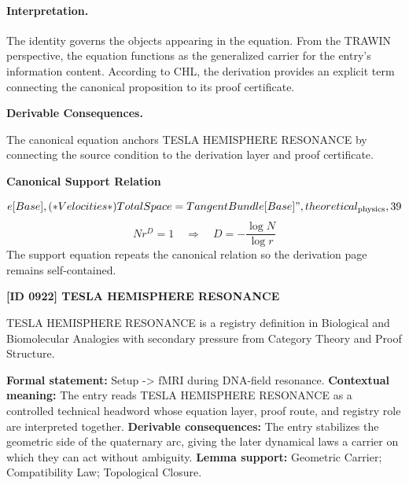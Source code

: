 \paragraph{Interpretation.}
The identity governs the objects appearing in the equation. From the TRAWIN perspective, the equation functions as the generalized carrier for the entry’s information content. According to CHL, the derivation provides an explicit term connecting the canonical proposition to its proof certificate.

\par\vspace{0.35em}
\noindent\textbf{Derivable Consequences.}\quad
\begingroup
\footnotesize
\raggedright
The canonical equation anchors TESLA HEMISPHERE RESONANCE by connecting the source condition to the derivation layer and proof certificate.
\par\endgroup

\noindent\textbf{Canonical Support Relation}\par
\[
e[Base], (* Velocities *) TotalSpace = TangentBundle[Base]",theoretical_{\mathrm{physics}},39
\]
\[
N r^{D} = 1 \quad\Longrightarrow\quad D = -\frac{\log N}{\log r}
\]
\noindent The support equation repeats the canonical relation so the derivation page remains self-contained.\par

\clearpage
\noindent\textbf{[ID 0922] TESLA HEMISPHERE RESONANCE}\par
\vspace{0.35em}
\begingroup\small
{}
TESLA HEMISPHERE RESONANCE is a registry definition in Biological and Biomolecular Analogies with secondary pressure from Category Theory and Proof Structure.

\begingroup\footnotesize\setlength{\emergencystretch}{3em}\sloppy
\textbf{Formal statement:} Setup -> fMRI during DNA-field resonance. \textbf{Contextual meaning:} The entry reads TESLA HEMISPHERE RESONANCE as a controlled technical headword whose equation layer, proof route, and registry role are interpreted together. \textbf{Derivable consequences:} The entry stabilizes the geometric side of the quaternary arc, giving the later dynamical laws a carrier on which they can act without ambiguity. \textbf{Lemma support:} Geometric Carrier; Compatibility Law; Topological Closure.\par
\endgroup

